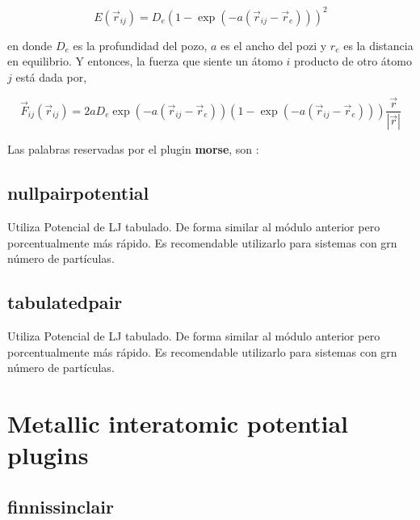 $$E(\vec{r}_{ij}) = D_e\left(1-\exp(-a(\vec{r}_{ij}-\vec{r}_e))\right)^2$$

en donde $D_e$ es la profundidad del pozo, $a$ es el ancho del pozi y $r_e$ es
la distancia en equilibrio. Y entonces, la fuerza que siente un \'atomo $i$
producto de otro \'atomo $j$ est\'a dada por,

$$\vec{F}_{ij} ( \vec{r}_{ij}) =
2aD_e\exp(-a(\vec{r}_{ij}-\vec{r}_e))\left(1-\exp(-a(\vec{r}_{ij}-\vec{r}
_e))\right)\frac{\vec{r}}{|\vec{r}|}$$

Las palabras reservadas por el plugin \textbf{morse}, son :


\subsection{nullpairpotential}
Utiliza Potencial de LJ tabulado. De forma similar al m\'odulo anterior pero
porcentualmente m\'as r\'apido. Es recomendable utilizarlo para sistemas con grn
n\'umero de part\'iculas.

\subsection{tabulatedpair}
Utiliza Potencial de LJ tabulado. De forma similar al m\'odulo anterior pero
porcentualmente m\'as r\'apido. Es recomendable utilizarlo para sistemas con grn
n\'umero de part\'iculas.


\section{Metallic interatomic potential plugins}

\subsection{finnissinclair}

